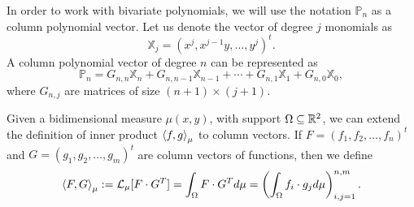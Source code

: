 \documentclass[portrait,final,a0paper,fontscale=0.38]{baposter}
\begin{document}
\begin{poster}
{  In order to work with bivariate polynomials, we will use the notation $\mathbb P_n$ as a column polynomial vector. Let us denote the vector of degree $j$ monomials as
  $$
  \mathbb{X}_j=(x^j, x^{j-1}y , \dots, y^j)^t.
  $$
  A column polynomial vector of degree $n$ can be represented as
  $$
  \mathbb{P}_n = G_{n,n}\mathbb{X}_n + G_{n,n-1}\mathbb{X}_{n-1}+\cdots + G_{n,1}\mathbb{X}_1 + G_{n,0}\mathbb X_0,
  $$
  where $G_{n,j}$ are matrices of size $(n+1)\times(j+1)$. 

  Given a bidimensional measure $\mu(x,y)$, with support $\Omega\subseteq\mathbb{R}^2$, we can extend the definition of inner product $\left\langle f , g \right\rangle_\mu$ to column vectors. If $F=(f_1,f_2,\dots,f_n)^t$ and \linebreak $G=(g_1,g_2,\dots, g_m)^t$ are column vectors of functions, then we define
  \begin{equation}
    \label{eq:prodesc-matrix}
    \left\langle F , G \right\rangle_\mu :=\mathcal{L}_\mu[F\cdot G^T] = \int_\Omega F\cdot G^T d\mu = \left(\int_\Omega f_i\cdot g_j d\mu\right)_{i,j=1}^{n,m}.
  \end{equation}

%  

}
\end{poster}
\end{document}
